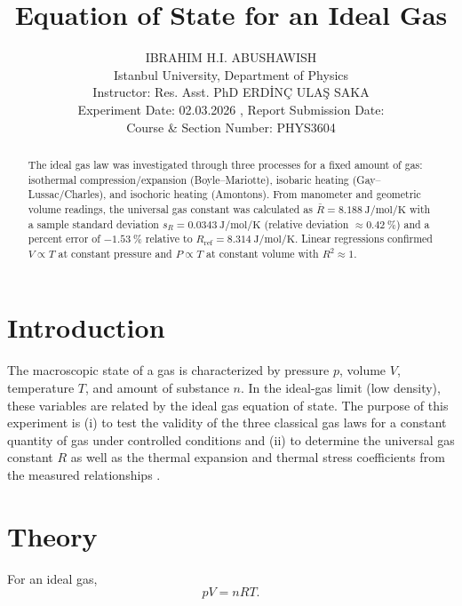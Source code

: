 \documentclass[journal]{IEEEtran}
\begin{document}
\title{Equation of State for an Ideal Gas}
\author{IBRAHIM H.I. ABUSHAWISH \\
Istanbul University, Department of Physics \\
Instructor: Res. Asst. PhD ERDİNÇ ULAŞ SAKA \\
Experiment Date: 02.03.2026 , Report Submission Date: \\
Course \& Section Number: PHYS3604}


\maketitle

\begin{abstract}
The ideal gas law was investigated through three processes for a fixed amount of gas: isothermal compression/expansion (Boyle--Mariotte), isobaric heating (Gay--Lussac/Charles), and isochoric heating (Amontons). From manometer and geometric volume readings, the universal gas constant was calculated as $\bar{R}=\SI{8.188}{\joule\per\mole\per\kelvin}$ with a sample standard deviation $s_R=\SI{0.0343}{\joule\per\mole\per\kelvin}$ (relative deviation $\approx\SI{0.42}{\percent}$) and a percent error of $\SI{-1.53}{\percent}$ relative to $R_\mathrm{ref}=\SI{8.314}{\joule\per\mole\per\kelvin}$. Linear regressions confirmed $V\propto T$ at constant pressure and $P\propto T$ at constant volume with $R^2\approx 1$.
\end{abstract}

\section{Introduction}
The macroscopic state of a gas is characterized by pressure $p$, volume $V$, temperature $T$, and amount of substance $n$. In the ideal-gas limit (low density), these variables are related by the ideal gas equation of state. The purpose of this experiment is (i) to test the validity of the three classical gas laws for a constant quantity of gas under controlled conditions and (ii) to determine the universal gas constant $R$ as well as the thermal expansion and thermal stress coefficients from the measured relationships \cite{lab_manual}.

\section{Theory}
For an ideal gas,
\begin{equation}
	pV = nRT.
	\label{eq:ideal_gas}
\end{equation}
\end{document}
